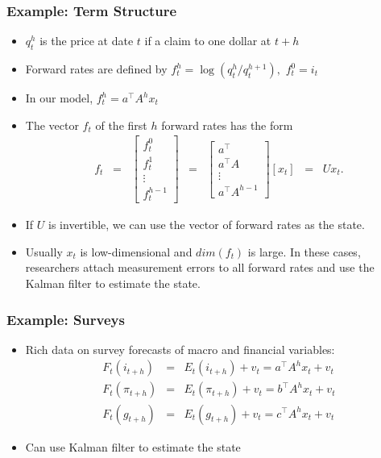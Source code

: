 \documentclass[handout]{beamer}
\begin{document}
\begin{frame}
\frametitle{Example: Term Structure}

\begin{itemize} %
    \item $q_t^h$ is the price at date $t$ if a claim to one dollar at $t+h$
    \item Forward rates are defined by $ f^h_t = \log (q^h_t/q^{h+1}_t),$ $f^0_t=i_t$
   \item In our model, $f^h_t = a^{\top} A^h x_t$
   \item The vector $f_t$ of the first $h$ forward rates has the form
\begin{eqnarray*}
    f_t  \;\;=\;\; \left[  \begin{array}{c} f^0_t \\ f^1_t \\ \vdots \\ f^{h-1}_t \end{array} \right]
        &=&
    \left[  \begin{array}{c} a^\top \\ a^\top A \\ \vdots \\ a^\top A^{h-1} \end{array} \right]         \left[ x_t \right]
    \;\;=\;\; U x_t .
\end{eqnarray*}
 \item If $U$ is invertible, we can use the vector of forward rates as the state. %
 \item Usually $x_t$ is low-dimensional and $dim(f_t)$ is large. In these cases, researchers attach measurement errors to all forward rates and  use  the Kalman filter to estimate the state.
\end{itemize}

\end{frame}

\begin{frame}
\frametitle{Example: Surveys}

\begin{itemize} %
    \item Rich data on survey forecasts of macro and financial variables:
    \begin{eqnarray*}
     F_t(i_{t+h})&=&E_t(i_{t+h})+v_t=a^{\top} A^h x_t + v_t \\
   F_t(\pi_{t+h})&=&E_t(\pi_{t+h})+v_t=b^{\top} A^h x_t + v_t \\
    F_t(g_{t+h})&=&E_t(g_{t+h})+v_t=c^{\top} A^h x_t + v_t
\end{eqnarray*}
\item Can use Kalman filter to estimate the state
\end{itemize}

\end{frame}
\end{document}
